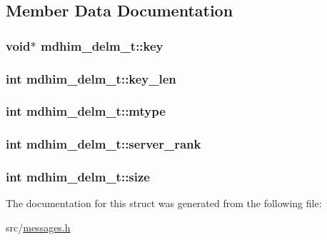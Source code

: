 \subsection{Member Data Documentation}
\hypertarget{structmdhim__delm__t_acedac9daad7ab8b9870f8c7c2a471ced}{
\subsubsection[{key}]{\setlength{\rightskip}{0pt plus 5cm}void$\ast$ mdhim\-\_\-delm\-\_\-t\-::key}}\label{structmdhim__delm__t_acedac9daad7ab8b9870f8c7c2a471ced}
\hypertarget{structmdhim__delm__t_aed818ed56728fe40acd3567fce5a2fb5}{
\subsubsection[{key\-\_\-len}]{\setlength{\rightskip}{0pt plus 5cm}int mdhim\-\_\-delm\-\_\-t\-::key\-\_\-len}}\label{structmdhim__delm__t_aed818ed56728fe40acd3567fce5a2fb5}
\hypertarget{structmdhim__delm__t_aed97225c8df041600c6b5fffb43a1bbc}{
\subsubsection[{mtype}]{\setlength{\rightskip}{0pt plus 5cm}int mdhim\-\_\-delm\-\_\-t\-::mtype}}\label{structmdhim__delm__t_aed97225c8df041600c6b5fffb43a1bbc}
\hypertarget{structmdhim__delm__t_a00480044a106cf24c63e03b3d15320dc}{
\subsubsection[{server\-\_\-rank}]{\setlength{\rightskip}{0pt plus 5cm}int mdhim\-\_\-delm\-\_\-t\-::server\-\_\-rank}}\label{structmdhim__delm__t_a00480044a106cf24c63e03b3d15320dc}
\hypertarget{structmdhim__delm__t_a72a3a5a840b005517685ab4a5f9e101e}{
\subsubsection[{size}]{\setlength{\rightskip}{0pt plus 5cm}int mdhim\-\_\-delm\-\_\-t\-::size}}\label{structmdhim__delm__t_a72a3a5a840b005517685ab4a5f9e101e}


The documentation for this struct was generated from the following file\-:\begin{DoxyCompactItemize}
\item 
src/\hyperlink{messages_8h}{messages.\-h}\end{DoxyCompactItemize}
